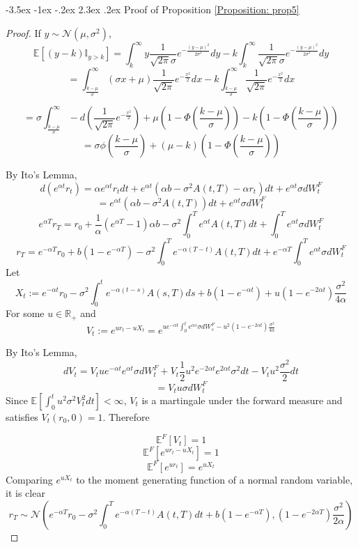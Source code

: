 \documentclass[12pt]{article}
\makeatletter
\renewcommand\section{\@startsection{section}{1}{\z@}%
                                  {-3.5ex \@plus -1ex \@minus -.2ex}%
                                  {2.3ex \@plus.2ex}%
                                  {\normalfont\large\bfseries}}
\theoremstyle{definition}
\theoremstyle{remark}
\makeatother
\begin{document}
\section{Proof of Proposition \ref{Proposition: prop5} }
\begin{proof}
If \(y \sim \mathcal{N}\left(\mu, \sigma^2\right) \), 
\[\mathbb{E}\left[(y-k)\mathbb{I}_{y> k}\right]=\int_k ^\infty y \frac{1}{\sqrt{2\pi}\sigma} e^{-\frac{(y-\mu)^2}{2\sigma^2}} dy -k\int_k ^\infty \frac{1}{\sqrt{2\pi}\sigma} e^{-\frac{(y-\mu)^2}{2\sigma^2}}dy\]
\[=\int_ \frac{k-\mu}{\sigma} ^\infty (\sigma x+\mu) \frac{1}{\sqrt{2\pi}} e^{-\frac{x^2}{2}} dx -k\int_ \frac{k-\mu}{\sigma} ^\infty \frac{1}{\sqrt{2\pi}} e^{-\frac{x^2}{2}} dx\]

\[=\sigma \int_ \frac{k-\mu}{\sigma} ^\infty -d\left(\frac{1}{\sqrt{2\pi}} e^{-\frac{x^2}{2}}\right)+\mu \left(1-\Phi \left( \frac{k-\mu}{\sigma}\right)\right)-k\left(1-\Phi \left( \frac{k-\mu}{\sigma}\right) \right)\]
\[=\sigma \phi\left(\frac{k-\mu}{\sigma}\right)+(\mu-k) \left(1-\Phi \left( \frac{k-\mu}{\sigma}\right)\right)\]

By Ito's Lemma,
\[d \left(e^{\alpha t} r_t\right)=\alpha e^{\alpha t}r_t dt + e^{\alpha t} \left(\alpha b-\sigma^2 A(t, T)-\alpha r_t \right) dt +e^{\alpha t} \sigma dW^F_t \]
\[=e^{\alpha t} \left(\alpha b-\sigma^2 A(t, T)\right) dt +e^{\alpha t} \sigma dW^F_t \]
\[e^{\alpha T} r_T= r_0 + \frac{1}{\alpha}\left(e^{\alpha T} -1\right) \alpha b-\sigma^2 \int _0^T e^{\alpha t}A(t, T) dt +\int _ 0 ^ T e^{\alpha t} \sigma dW^F_t \]
\[r_T = e^{-\alpha T} r_0+ b \left(1-e^{-\alpha T}\right)-\sigma^2 \int _0^T e^{-\alpha (T-t)}A(t, T) dt+e^{-\alpha T} \int _ 0 ^ T e^{\alpha t} \sigma dW^F_t \]
Let 
\[X_t :=e^{-\alpha t} r_0-\sigma^2 \int _0^t e^{-\alpha (t-s)}A(s, T) ds+ b \left(1-e^{-\alpha t}\right)+  u\left(1 -e^{-2\alpha t}\right)\frac{\sigma^2}{4\alpha} \]
For some \(u\in \mathbb{R}_+\) and 
\[V_t:=e^{ur_t -uX_t}=e^{ue^{-\alpha t} \int _ 0 ^ t e^{\alpha s} \sigma dW^F_s -u^2\left(1 -e^{-2\alpha t}\right)\frac{\sigma^2}{4\alpha}}\]  

By Ito's Lemma, 
\[d V_t= V_t ue^{-\alpha t} e^{\alpha t} \sigma dW^F _t +V_t \frac{1}{2} u^2 e^{-2\alpha t} e^{2 \alpha t} \sigma ^2 dt -V_t u^2 \frac{\sigma^2}{2} dt\]
\[=V_tu\sigma dW^F_t \]
Since \(\mathbb{E}\left[\int_0 ^t u^2\sigma^2 V_t ^2 dt \right] < \infty\), \(V_t\) is a martingale under the forward measure and satisfies \(V_t (r_0, 0)=1\).  Therefore 

\[\mathbb{E}^F[V_t]=1\]
\[\mathbb{E}^F[e^{ur_t -uX_t}]=1\]
\[\mathbb{E}^F [e^{ur_t}]=e^{uX_t}\]
Comparing \(e^{uX_t}\) to the moment generating function of a normal random variable, it is clear 
\[r_T \sim \mathcal{N} \left(e^{-\alpha T} r_0-\sigma^2 \int _0^T e^{-\alpha (T-t)}A(t, T) dt+ b \left(1-e^{-\alpha T}\right), \left(1 -e^{-2\alpha T}\right)\frac{\sigma^2}{2\alpha} \right) \]


\end{proof}
\end{document}
